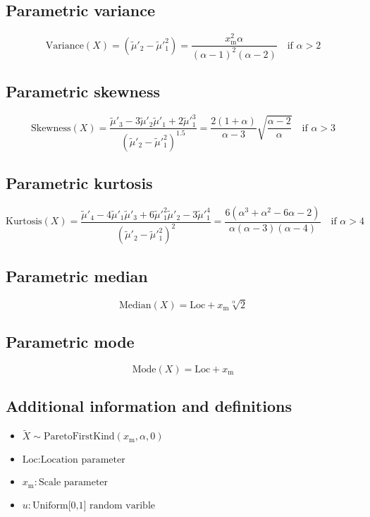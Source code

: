 \documentclass{article}
\begin{document}
\subsection{Parametric variance}
\begin{equation*} \mathrm{Variance}(X)=(\tilde{\mu}'_{2}-\tilde{\mu}'^{2}_{1})=\dfrac{x_\mathrm{m}^2\alpha}{(\alpha- 1)^2(\alpha-2)} \quad \text{if }\alpha>2 \end{equation*}
\subsection{Parametric skewness}
\begin{equation*} \mathrm{Skewness}(X)=\frac{\tilde{\mu}'_{3}-3\tilde{\mu}'_{2}\tilde{\mu}'_{1}+2\tilde{\mu}'^{3}_{1}}{(\tilde{\mu}'_{2}-\tilde{\mu}'^{2}_{1})^{1.5}}=\frac{2(1+\alpha)}{\alpha-3}\sqrt{\frac{\alpha-2}{\alpha}}\quad \text{if } \alpha>3 \end{equation*}
\subsection{Parametric kurtosis}
\begin{equation*} \mathrm{Kurtosis}(X)=\frac{\tilde{\mu}'_{4}-4\tilde{\mu}'_{1}\tilde{\mu}'_{3}+6\tilde{\mu}'^{2}_{1}\tilde{\mu}'_{2}-3\tilde{\mu}'^{4}_{1}}{(\tilde{\mu}'_{2}-\tilde{\mu}'^{2}_{1})^{2}}=\frac{6(\alpha^3+\alpha^2-6\alpha-2)}{\alpha(\alpha-3)(\alpha-4)}\quad \text{if }\alpha>4 \end{equation*}
\subsection{Parametric median}
\begin{equation*} \mathrm{Median}(X)=\text{Loc}+x_\mathrm{m} \sqrt[\alpha]{2} \end{equation*}
\subsection{Parametric mode}
\begin{equation*} \mathrm{Mode}(X)=\text{Loc}+x_\mathrm{m} \end{equation*}
\subsection{Additional information and definitions}
\begin{itemize}
    \item $ \tilde{X}\sim\mathrm{ParetoFirstKind}\left(x_\mathrm{m},\alpha,0\right) $
    \item $ \text{Loc}:\text{Location parameter} $
    \item $ x_\mathrm{m}:\text{Scale parameter} $
    \item $ u:\text{Uniform[0,1] random varible} $
\end{itemize}
\end{document}
